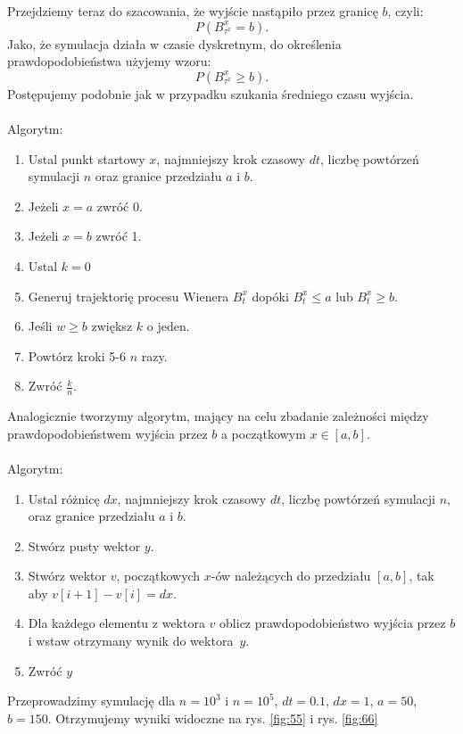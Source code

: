 \documentclass{article}
\theoremstyle{break}
\numberwithin{equation}{subsection}
\numberwithin{figure}{section}
\begin{document}
Przejdziemy teraz do szacowania, że wyjście nastąpiło przez granicę $b$, czyli:
$$P(B_{\tau^x}^x=b).$$
Jako, że symulacja działa w czasie dyskretnym, do określenia prawdopodobieństwa użyjemy wzoru:
$$P(B_{\tau^x}^x\geq b).$$
Postępujemy podobnie jak w przypadku szukania średniego czasu wyjścia.\\ \\
Algorytm:
\begin{enumerate}
	\item Ustal punkt startowy $x$, najmniejszy krok czasowy $dt$, liczbę powtórzeń symulacji $n$  oraz granice przedziału $a$ i $b$.
	\item Jeżeli $x=a$ zwróć 0.
	\item Jeżeli $x=b$ zwróć 1.
	\item Ustal $k=0$ 
	\item Generuj trajektorię procesu Wienera $B_t^x$ dopóki $B_t^x\leq a$ lub $B_t^x\geq b$.
	\item Jeśli $w\geq b$ zwiększ $k$ o jeden.
	\item Powtórz kroki 5-6 $n$ razy.
	\item Zwróć $\frac{k}{n}$.
\end{enumerate}
Analogicznie tworzymy algorytm, mający na celu zbadanie zależności między prawdopodobieństwem wyjścia przez $b$ a początkowym $x\in [a,b]$.\\ \\ 
Algorytm:
\begin{enumerate}
	\item Ustal różnicę $dx$, najmniejszy krok czasowy $dt$, liczbę powtórzeń symulacji $n$, oraz granice przedziału $a$ i $b$.
	\item Stwórz pusty wektor $y$.
	\item Stwórz wektor $v$, początkowych $x$-ów należących do przedziału $[a,b]$, tak aby $v[i+1]-v[i]=dx$.
	\item Dla każdego elementu z wektora $v$ oblicz prawdopodobieństwo wyjścia przez $b$ i wstaw otrzymany wynik do wektora~$y$.
	\item Zwróć $y$
\end{enumerate}
Przeprowadzimy symulację dla $n=10^3$ i $n=10^5$, $dt=0.1$, $dx=1$, $a=50$, $b=150$. Otrzymujemy wyniki widoczne na rys. \ref{fig:55} i rys. \ref{fig:66}
\end{document}
